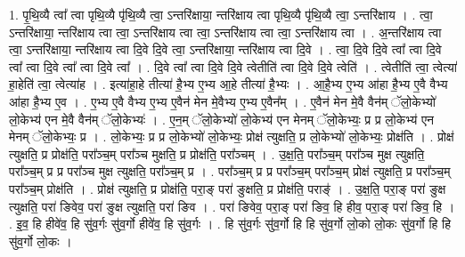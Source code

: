 \documentclass[17pt]{extarticle}
\begin{document}
1. पृ॒थि॒व्यै त्वा᳚ त्वा पृथि॒व्यै पृ॑थि॒व्यै त्वा॒ ऽन्तरि॑क्षाया॒ न्तरि॑क्षाय त्वा पृथि॒व्यै पृ॑थि॒व्यै त्वा॒ ऽन्तरि॑क्षाय । . त्वा॒ ऽन्तरि॑क्षाया॒ न्तरि॑क्षाय त्वा त्वा॒ ऽन्तरि॑क्षाय त्वा त्वा॒ ऽन्तरि॑क्षाय त्वा त्वा॒ ऽन्तरि॑क्षाय त्वा । . अ॒न्तरि॑क्षाय त्वा त्वा॒ ऽन्तरि॑क्षाया॒ न्तरि॑क्षाय त्वा दि॒वे दि॒वे त्वा॒ ऽन्तरि॑क्षाया॒ न्तरि॑क्षाय त्वा दि॒वे । . त्वा॒ दि॒वे दि॒वे त्वा᳚ त्वा दि॒वे त्वा᳚ त्वा दि॒वे त्वा᳚ त्वा दि॒वे त्वा᳚ । . दि॒वे त्वा᳚ त्वा दि॒वे दि॒वे त्वेतीति॑ त्वा दि॒वे दि॒वे त्वेति॑ । . त्वेतीति॑ त्वा॒ त्वेत्या॑ हा॒हेति॑ त्वा॒ त्वेत्या॑ह । . इत्या॑हा॒हे तीत्या॑ है॒भ्य ए॒भ्य आ॒हे तीत्या॑ है॒भ्यः । . आ॒है॒भ्य ए॒भ्य आ॑हा है॒भ्य ए॒वै वैभ्य आ॑हा है॒भ्य ए॒व । . ए॒भ्य ए॒वै वैभ्य ए॒भ्य ए॒वैन॑ मेन मे॒वैभ्य ए॒भ्य ए॒वैन᳚म् । . ए॒वैन॑ मेन मे॒वै वैन॑म् ॅलो॒केभ्यो॑ लो॒केभ्य॑ एन मे॒वै वैन॑म् ॅलो॒केभ्यः॑ । . ए॒न॒म् ॅलो॒केभ्यो॑ लो॒केभ्य॑ एन मेनम् ॅलो॒केभ्यः॒ प्र प्र लो॒केभ्य॑ एन मेनम् ॅलो॒केभ्यः॒ प्र । . लो॒केभ्यः॒ प्र प्र लो॒केभ्यो॑ लो॒केभ्यः॒ प्रोक्ष॑ त्युक्षति॒ प्र लो॒केभ्यो॑ लो॒केभ्यः॒ प्रोक्ष॑ति । . प्रोक्ष॑ त्युक्षति॒ प्र प्रोक्ष॑ति॒ परा᳚ञ्च॒म् परा᳚ञ्च मुक्षति॒ प्र प्रोक्ष॑ति॒ परा᳚ञ्चम् । . उ॒क्ष॒ति॒ परा᳚ञ्च॒म् परा᳚ञ्च मुक्ष त्युक्षति॒ परा᳚ञ्च॒म् प्र प्र परा᳚ञ्च मुक्ष त्युक्षति॒ परा᳚ञ्च॒म् प्र । . परा᳚ञ्च॒म् प्र प्र परा᳚ञ्च॒म् परा᳚ञ्च॒म् प्रोक्ष॑ त्युक्षति॒ प्र परा᳚ञ्च॒म् परा᳚ञ्च॒म् प्रोक्ष॑ति । . प्रोक्ष॑ त्युक्षति॒ प्र प्रोक्ष॑ति॒ परा॒ङ् परा॑ ङुक्षति॒ प्र प्रोक्ष॑ति॒ पराङ्॑ । . उ॒क्ष॒ति॒ परा॒ङ् परा॑ ङुक्ष त्युक्षति॒ परा॑ ङिवेव॒ परा॑ ङुक्ष त्युक्षति॒ परा॑ ङिव । . परा॑ ङिवेव॒ परा॒ङ् परा॑ ङिव॒ हि हीव॒ परा॒ङ् परा॑ ङिव॒ हि । . इ॒व॒ हि हीवे॑व॒ हि सु॑व॒र्गः सु॑व॒र्गो हीवे॑व॒ हि सु॑व॒र्गः । . हि सु॑व॒र्गः सु॑व॒र्गो हि हि सु॑व॒र्गो लो॒को लो॒कः सु॑व॒र्गो हि हि सु॑व॒र्गो लो॒कः । \newline
\end{document}
